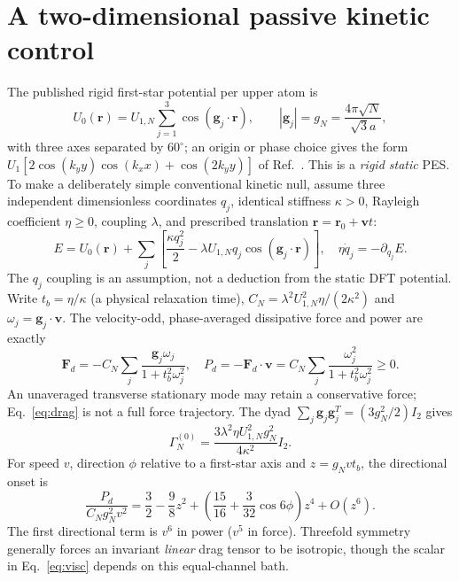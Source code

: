 \documentclass[9pt,a4paper,twocolumn]{extarticle}
\begin{document}
\section{A two-dimensional passive kinetic control}
The published rigid first-star potential per upper atom is
\begin{equation}
 U_0(\mathbf r)=U_{1,N}\sum_{j=1}^{3}\cos(\mathbf g_j\cdot\mathbf r),\qquad
 |\mathbf g_j|=g_N=\frac{4\pi\sqrt N}{\sqrt3a},
 \label{eq:star}
\end{equation}
with three axes separated by $60^\circ$; an origin or phase choice gives the form $U_1[2\cos(k_yy)\cos(k_xx)+\cos(2k_yy)]$ of Ref.~\cite{lebedeva}. This is a \emph{rigid static} PES. To make a deliberately simple conventional kinetic null, assume three independent dimensionless coordinates $q_j$, identical stiffness $\kappa>0$, Rayleigh coefficient $\eta\geq0$, coupling $\lambda$, and prescribed translation $\mathbf r=\mathbf r_0+\mathbf vt$:
\begin{equation}
 E=U_0(\mathbf r)+\sum_j\left[\frac{\kappa q_j^2}{2}-\lambda U_{1,N}q_j\cos(\mathbf g_j\cdot\mathbf r)\right],\quad
 \eta\dot q_j=-\partial_{q_j}E.\label{eq:bath}
\end{equation}
The $q_j$ coupling is an assumption, not a deduction from the static DFT potential. Write $t_b=\eta/\kappa$ (a physical relaxation time), $C_N=\lambda^2U_{1,N}^2\eta/(2\kappa^2)$ and $\omega_j=\mathbf g_j\cdot\mathbf v$. The velocity-odd, phase-averaged dissipative force and power are exactly
\begin{equation}
 \mathbf F_d=-C_N\sum_j\frac{\mathbf g_j\omega_j}{1+t_b^2\omega_j^2},\quad
 P_d=-\mathbf F_d\cdot\mathbf v=C_N\sum_j\frac{\omega_j^2}{1+t_b^2\omega_j^2}\geq0.
 \label{eq:drag}
\end{equation}
An unaveraged transverse stationary mode may retain a conservative force; Eq.~\eqref{eq:drag} is not a full force trajectory. The dyad $\sum_j\mathbf g_j\mathbf g_j^T=(3g_N^2/2)I_2$ gives
\begin{equation}
 \Gamma_N^{(0)}=\frac{3\lambda^2\eta U_{1,N}^2g_N^2}{4\kappa^2}I_2.\label{eq:visc}
\end{equation}
For speed $v$, direction $\phi$ relative to a first-star axis and $z=g_Nvt_b$, the directional onset is
\begin{equation}
 \frac{P_d}{C_Ng_N^2v^2}=\frac32-\frac98z^2+
 \left(\frac{15}{16}+\frac{3}{32}\cos6\phi\right)z^4+O(z^6).
 \label{eq:sixfold}
\end{equation}
The first directional term is $v^6$ in power ($v^5$ in force). Threefold symmetry generally forces an invariant \emph{linear} drag tensor to be isotropic, though the scalar in Eq.~\eqref{eq:visc} depends on this equal-channel bath.
\end{document}
